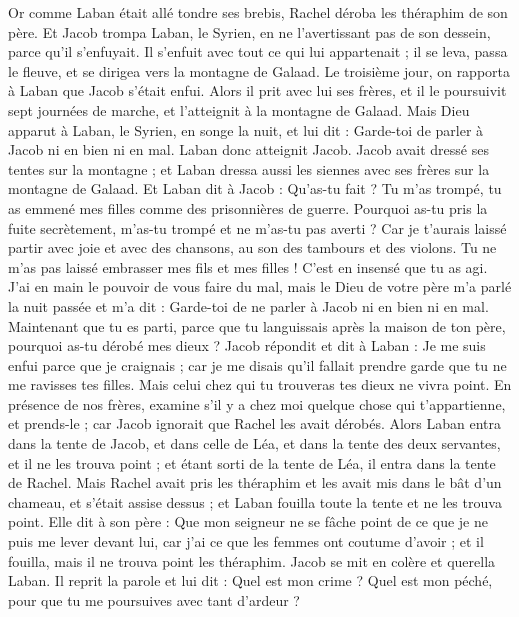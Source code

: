 \begin{multicols}{2}
Or comme Laban était allé tondre ses brebis, Rachel déroba les théraphim de son père.
Et Jacob trompa Laban, le Syrien, en ne l'avertissant pas de son dessein, parce qu'il s'enfuyait.
Il s'enfuit avec tout ce qui lui appartenait ; il se leva, passa le fleuve, et se dirigea vers la montagne de Galaad.
Le troisième jour, on rapporta à Laban que Jacob s'était enfui.
Alors il prit avec lui ses frères, et il le poursuivit sept journées de marche, et l'atteignit à la montagne de Galaad.
Mais Dieu apparut à Laban, le Syrien, en songe la nuit, et lui dit : Garde-toi de parler à Jacob ni en bien ni en mal.
Laban donc atteignit Jacob. Jacob avait dressé ses tentes sur la montagne ; et Laban dressa aussi les siennes avec ses frères sur la montagne de Galaad.
Et Laban dit à Jacob : Qu'as-tu fait ? Tu m'as trompé, tu as emmené mes filles comme des prisonnières de guerre.
Pourquoi as-tu pris la fuite secrètement, m'as-tu trompé et ne m'as-tu pas averti ? Car je t'aurais laissé partir avec joie et avec des chansons, au son des tambours et des violons.
Tu ne m'as pas laissé embrasser mes fils et mes filles ! C'est en insensé que tu as agi.
J'ai en main le pouvoir de vous faire du mal, mais le Dieu de votre père m'a parlé la nuit passée et m'a dit : Garde-toi de ne parler à Jacob ni en bien ni en mal.
Maintenant que tu es parti, parce que tu languissais après la maison de ton père, pourquoi as-tu dérobé mes dieux ?
Jacob répondit et dit à Laban : Je me suis enfui parce que je craignais ; car je me disais qu'il fallait prendre garde que tu ne me ravisses tes filles.
Mais celui chez qui tu trouveras tes dieux ne vivra point. En présence de nos frères, examine s'il y a chez moi quelque chose qui t'appartienne, et prends-le ; car Jacob ignorait que Rachel les avait dérobés.
Alors Laban entra dans la tente de Jacob, et dans celle de Léa, et dans la tente des deux servantes, et il ne les trouva point ; et étant sorti de la tente de Léa, il entra dans la tente de Rachel.
Mais Rachel avait pris les théraphim et les avait mis dans le bât d'un chameau, et s'était assise dessus ; et Laban fouilla toute la tente et ne les trouva point.
Elle dit à son père : Que mon seigneur ne se fâche point de ce que je ne puis me lever devant lui, car j'ai ce que les femmes ont coutume d'avoir ; et il fouilla, mais il ne trouva point les théraphim.
Jacob se mit en colère et querella Laban. Il reprit la parole et lui dit : Quel est mon crime ? Quel est mon péché, pour que tu me poursuives avec tant d'ardeur ?

\end{multicols}
